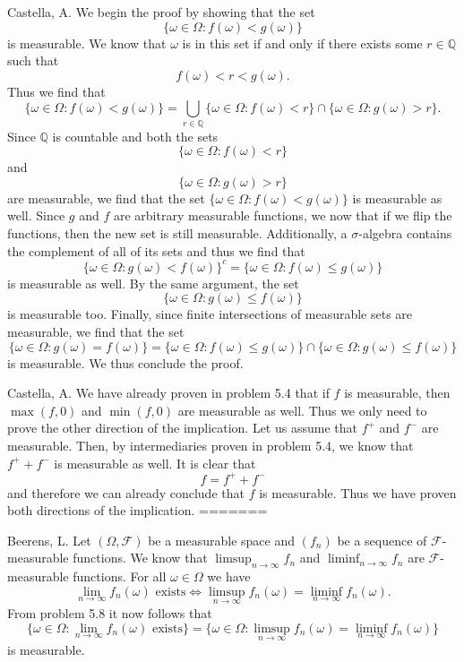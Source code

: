 \begin{solution}[5.8]{Castella, A.}
    We begin the proof by showing that the set
    $$
        \{\omega \in \Omega : f(\omega) < g(\omega)\}
    $$
    is measurable. We know that $\omega$ is in this set if and only if there exists some $r \in \mathbb{Q}$ such that
    $$
        f(\omega) < r < g(\omega).
    $$
    Thus we find that
    $$
        \{\omega \in \Omega : f(\omega) < g(\omega)\} = \bigcup_{r \in \mathbb{Q}}\{\omega\in\Omega : f(\omega) < r\} \cap \{\omega\in\Omega : g(\omega) > r\}.
    $$
    Since $\mathbb{Q}$ is countable and both the sets
    $$
        \{\omega \in \Omega : f(\omega) < r\}
    $$
    and
    $$
        \{\omega \in \Omega : g(\omega) > r\}
    $$
    are measurable, we find that the set $\{\omega \in \Omega : f(\omega) < g(\omega)\}$ is measurable as well. Since $g$ and $f$ are arbitrary measurable functions, we now that if we flip the functions, then the new set is still measurable. Additionally, a $\sigma$-algebra contains the complement of all of its sets and thus we find that
    $$
        \{\omega \in \Omega : g(\omega) < f(\omega)\}^c = \{\omega \in \Omega : f(\omega) \leq g(\omega)\}
    $$
    is measurable as well. By the same argument, the set
    $$
        \{\omega \in \Omega : g(\omega) \leq f(\omega)\}
    $$
    is measurable too. Finally, since finite intersections of measurable sets are measurable, we find that the set
    $$
        \{\omega \in \Omega : g(\omega) = f(\omega)\} = \{\omega \in \Omega : f(\omega) \leq g(\omega)\} \cap \{\omega \in \Omega : g(\omega) \leq f(\omega)\}
    $$
    is measurable. We thus conclude the proof.
\end{solution}

\begin{solution}[5.14]{Castella, A.}
    We have already proven in problem 5.4 that if $f$ is measurable, then $\max(f,0)$ and $\min(f,0)$ are measurable as well. Thus we only need to prove the other direction of the implication. Let us assume that $f^+$ and $f^-$ are measurable. Then, by intermediaries proven in problem 5.4, we know that $f^+ + f^-$ is measurable as well. It is clear that
    $$
        f = f^+ + f^-
    $$
    and therefore we can already conclude that $f$ is measurable. Thus we have proven both directions of the implication. 
=======
\end{solution}

\begin{solution}[5.9]{Beerens, L.}
    Let $(\Omega, \mathcal{F})$ be a measurable space and $(f_n)$ be a sequence of $\mathcal{F}$-measurable functions. 
    We know that $\limsup_{n\rightarrow\infty}f_n$ and $\liminf_{n\rightarrow\infty}f_n$ are $\mathcal{F}$-measurable functions. For all $\omega\in\Omega$ we have 
    $$
        \lim_{n\rightarrow\infty}f_n(\omega) \text{ exists} \iff \limsup_{n\rightarrow\infty}f_n(\omega)=\liminf_{n\rightarrow\infty}f_n(\omega).
    $$
    From problem 5.8 it now follows that
    $$
        \{\omega \in \Omega : \lim_{n\rightarrow\infty}f_n(\omega) \text{ exists}\} = \{\omega \in \Omega :\limsup_{n\rightarrow\infty}f_n(\omega)=\liminf_{n\rightarrow\infty}f_n(\omega) \}
    $$
    is measurable.
\end{solution}


